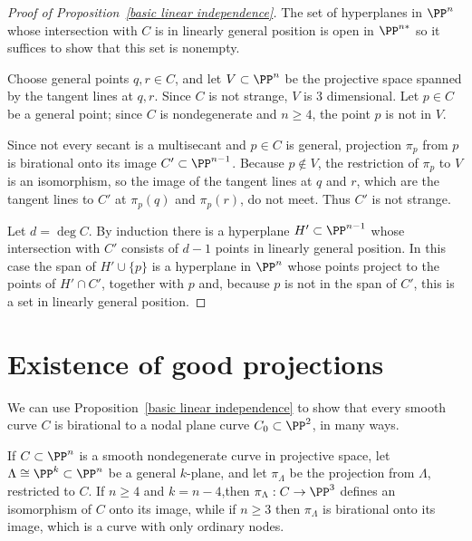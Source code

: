 \begin{proof}[Proof of Proposition~\ref{basic linear independence}]
The set of hyperplanes in $\PP^n$ whose intersection with $C$ is in linearly general position is open in $\PP^{n*}$ so it suffices to show that this set is nonempty.

Choose general points $q,r\in C$, and let $V\subset \PP^n$ be the projective space spanned by the tangent lines at $q,r$. Since $C$ is not strange, $V$ is 3 dimensional.
Let $p\in C$ be a general point; since $C$ is nondegenerate and $n\geq 4$, the point $p$ is not in $V$. 

Since not every secant is a multisecant and $p\in C$ is general,
projection $\pi_p$ from $p$ is birational onto its
 image $C'\subset \PP^{n-1}$. Because $p\notin V$, the restriction of $\pi_p$ to $V$
 is an isomorphism, so the image of the tangent lines at $q$ and $r$, which are
 the tangent lines to $C'$ at $\pi_p(q)$ and $\pi_p(r)$, do not meet. Thus
 $C'$ is not strange. 

Let $d= \deg C$. By induction there is a hyperplane $H'\subset \PP^{n-1}$ whose
intersection with $C'$ consists of $d-1$ points in linearly general position. In this case the span of $H' \cup \{p\}$ is a hyperplane in
$\PP^n$ whose points project to the points of $H'\cap C'$, together with $p$ and, because $p$ is not in the span of $C'$, this is a set in linearly general position.
\end{proof}


\section{Existence of good projections}\label{projection section}\label{good projections}

We can use Proposition~\ref{basic linear independence} to show that every smooth curve $C$ is birational to a nodal plane curve $C_0 \subset \PP^2$, in many ways.

\begin{proposition}\label{nodal projection}
If $C \subset \PP^n$ is a smooth nondegenerate curve in projective space, let $\Lambda \cong \PP^{k} \subset \PP^n$ be a general $k$-plane, and let
$\pi_\Lambda$ be the projection from $\Lambda$, restricted to $C$. If $n\geq 4$ and $k=n-4$,then
$\pi_\Lambda: C \to \PP^3$ defines an isomorphism of $C$ onto its image, while if $n\geq 3$ then $\pi_\Lambda$ is birational onto its image, which is a curve with only ordinary nodes.
\end{proposition}

